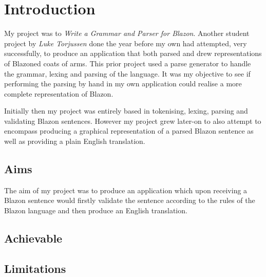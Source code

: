 \chapter{Introduction}

My project was to \emph{Write a Grammar and Parser for Blazon}. Another student project by \emph{Luke Torjussen} done the year before my own had attempted, very successfully, to produce an application that both parsed and drew representations of Blazoned coats of arms.  This prior project used a parse generator to handle the grammar, lexing and parsing of the language.  It was my objective to see if performing the parsing by hand in my own application could realise a more complete representation of Blazon.

Initially then my project was entirely based in tokenising, lexing, parsing and validating Blazon sentences.  However my project grew later-on to also attempt to encompass producing a graphical representation of a parsed Blazon sentence as well as providing a plain English translation. 

\section{Aims}
The aim of my project was to produce an application which upon receiving a Blazon sentence would firstly validate the sentence according to the rules of the Blazon language and then produce an English translation.   





\section{Achievable}


\section{Limitations}




